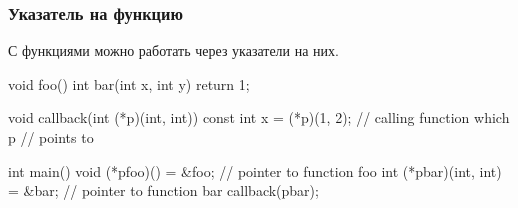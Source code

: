 \documentclass[compress, 8pt]{beamer}
\begin{document}
\begin{frame}[fragile]

    \frametitle{Указатель на функцию}

    С функциями можно работать через указатели на них.

    \begin{myinplacelisting}[minted language=cpp]
void foo() {}
int bar(int x, int y) { return 1; }

void callback(int (*p)(int, int)) {
    const int x = (*p)(1, 2); // calling function which p
                              // points to
}

int main() {
    void (*pfoo)() = &foo; // pointer to function foo
    int (*pbar)(int, int) = &bar; // pointer to function bar
    callback(pbar);
}
    \end{myinplacelisting}

\end{frame}
\end{document}
